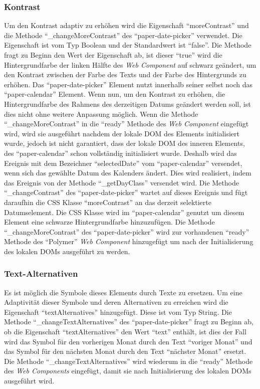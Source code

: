 \documentclass[12pt, paper=a4, bibtotoc, toc=listof, headsepline=true, numbers=endperiod]{scrreprt}
\begin{document}
		\subsubsection{Kontrast}
		Um den Kontrast adaptiv zu erhöhen wird die Eigenschaft \enquote{moreContrast} und die Methode \enquote{\_changeMoreContrast} des \enquote{paper-date-picker} verwendet. Die Eigenschaft ist vom Typ Boolean und der Standardwert ist \enquote{false}. Die Methode fragt zu Beginn den Wert der Eigenschaft ab, ist dieser \enquote{true} wird die Hintergrundfarbe der linken Hälfte des \emph{Web Component} auf schwarz geändert, um den Kontrast zwischen der Farbe des Texts und der Farbe des Hintergrunds zu erhöhen. Das \enquote{paper-date-picker} Element nutzt innerhalb seiner selbst noch das \enquote{paper-calendar} Element. Wenn nun, um den Kontrast zu erhöhen, die Hintergrundfarbe des Rahmens des derzeitigen Datums geändert werden soll, ist dies nicht ohne weitere Anpassung möglich. Wenn die Methode \enquote{\_changeMoreContrast} in die \enquote{ready} Methode des \emph{Web Component} eingefügt wird, wird sie ausgeführt nachdem der lokale \ac{DOM} des Elements initialisiert wurde, jedoch ist nicht garantiert, dass der lokale \ac{DOM} des inneren Elements, des \enquote{paper-calendar} schon vollständig initialisiert wurde. Deshalb wird das Ereignis mit dem Bezeichner \enquote{selectedDate} vom \enquote{paper-calendar} versendet, wenn sich das gewählte Datum des Kalenders ändert. Dies wird realisiert, indem das Ereignis von der Methode \enquote{\_getDayClass} versendet wird. Die Methode \enquote{\_changeContrast} des \enquote{paper-date-picker} wartet auf dieses Ereignis und fügt daraufhin die \ac{CSS} Klasse \enquote{moreContrast} an das derzeit selektierte Datumselement. Die \ac{CSS} Klasse wird im \enquote{paper-calendar} genutzt um diesem Element eine schwarze Hintergrundfarbe hinzuzufügen. Die Methode \enquote{\_changeMoreContrast} des \enquote{paper-date-picker} wird zur vorhandenen \enquote{ready} Methode des \enquote{Polymer} \emph{Web Component} hinzugefügt um nach der Initialisierung des lokalen \ac{DOM}s ausgeführt zu werden.
		\subsubsection{Text-Alternativen}
		Es ist möglich die Symbole dieses Elements durch Texte zu ersetzen. Um eine Adaptivität dieser Symbole und deren Alternativen zu erreichen wird die Eigenschaft \enquote{textAlternatives} hinzugefügt. Diese ist vom Typ String. Die Methode \enquote{\_changeTextAlternatives} des \enquote{paper-date-picker} fragt zu Beginn ab, ob die Eigenschaft \enquote{textAlternatives} den Wert \enquote{text} enthält, ist dies der Fall wird das Symbol für den vorherigen Monat durch den Text \enquote{voriger Monat} und das Symbol für den nächsten Monat durch den Text \enquote{nächster Monat} ersetzt. Die Methode \enquote{\_changeTextAlternatives} wird wiederum in die \enquote{ready} Methode des \emph{Web Components} eingefügt, damit sie nach Initialisierung des lokalen \ac{DOM}s ausgeführt wird. 
\end{document}
